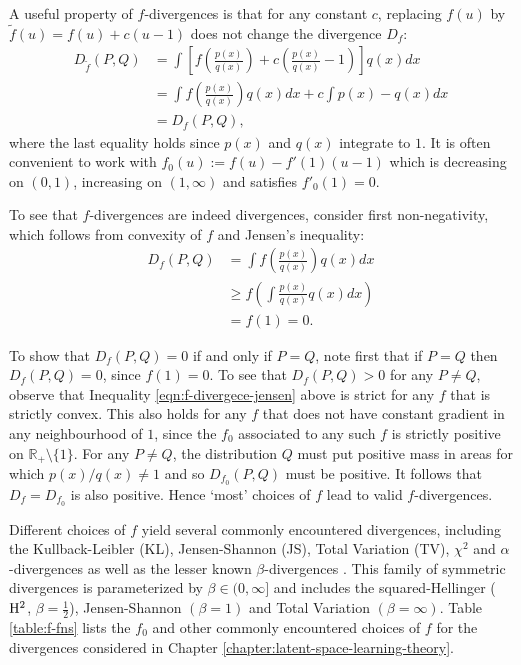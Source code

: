 A useful property of $f$-divergences is that for any constant $c$, replacing $f(u)$ by $\tilde{f}(u) = f(u) + c(u-1)$ does not change the divergence $D_f$:
%
\begin{align*}
D_{\tilde{f}}(P, Q) &= \int \left[ f\left(\frac{p(x)}{q(x)}\right) + c\left(\frac{p(x)}{q(x)} - 1\right) \right] q(x) dx \\
&=  \int f\left(\frac{p(x)}{q(x)}\right) q(x) dx + c \int p(x) - q(x) dx \\
&= D_f(P, Q),
\end{align*}
%
where the last equality holds since $p(x)$ and $q(x)$ integrate to $1$.
It is often convenient to work with $f_0(u) := f(u) - f'(1)(u-1)$ which is decreasing on $(0, 1)$, increasing on $(1, \infty)$ and satisfies $f'_0(1)=0$.


To see that $f$-divergences are indeed divergences, consider first non-negativity, which follows from convexity of $f$ and Jensen's inequality:
%
\begin{align}
D_f(P, Q) &= \int f\left(\frac{p(x)}{q(x)}\right) q(x) dx \nonumber \\ 
&\geq f\left(\int \frac{p(x)}{q(x)} q(x) dx\right) \label{eqn:f-divergece-jensen}\\
&= f(1) = 0. \nonumber
\end{align}
%

To show that $D_f(P,Q) = 0$ if and only if $P=Q$, note first that if $P=Q$ then $D_f(P,Q) = 0$, since $f(1)=0$.
To see that $D_f(P,Q) > 0$ for any $P \not= Q$, observe that Inequality \ref{eqn:f-divergece-jensen} above is strict for any $f$ that is strictly convex.
%
This also holds for any $f$ that does not have constant gradient in any neighbourhood of $1$, since the $f_0$ associated to any such $f$ is strictly positive on $\mathbb{R}_+\setminus \{1\}$.
For any $P\not= Q$, the distribution $Q$ must put positive mass in areas for which $p(x)/q(x) \not= 1$ and so  $D_{f_0}(P,Q)$ must be positive.
It follows that $D_f = D_{f_0}$ is also positive.
Hence `most' choices of $f$ lead to valid $f$-divergences.


Different choices of $f$ yield several commonly encountered divergences, including the Kullback-Leibler (KL), Jensen-Shannon (JS), Total Variation (TV), $\chi^2$ and $\alpha$-divergences as well as the lesser known $\beta$-divergences \citep{osterreicher2003new}.
This family of symmetric divergences is parameterized by $\beta\in(0, \infty]$ and includes the squared-Hellinger ($\mathrm{H}^2$, ${\beta=\frac{1}{2}}$),  Jensen-Shannon $(\beta=1)$ and Total Variation $(\beta=\infty)$. 
Table \ref{table:f-fns} lists the $f_0$ and other commonly encountered choices of $f$ for the divergences considered in Chapter \ref{chapter:latent-space-learning-theory}.

